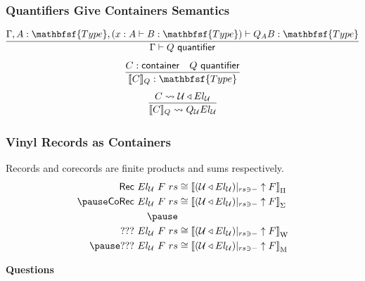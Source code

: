 \documentclass[tikz, 12pt]{beamer}
\def\Type{\mathbfsf{Type}}
\begin{document}
\begin{frame}
  \frametitle{Quantifiers Give Containers Semantics}
  \[
    \infer{\Gamma\vdash Q\ \mathsf{quantifier}}{
      \Gamma,A:\Type, (x:A\vdash B:\Type) \vdash Q_AB:\Type
    }
  \]\pause
  \[
    \infer{\llbracket C\rrbracket_Q : \Type}{
      C : \container &
      Q\ \mathsf{quantifier}
    }
  \]\pause
  \[
    \infer{
      \llbracket C\rrbracket_Q \leadsto Q_\mathcal{U} El_\mathcal{U}
    }{
      C \leadsto \mkcon{\mathcal{U}}{El_\mathcal{U}}
    }
  \]
\end{frame}

\begin{frame}
  \frametitle{Vinyl Records as Containers}\pause
  Records and corecords are finite products and sums respectively.\pause
  \[
    \begin{aligned}
      \mathsf{Rec}\ El_\mathcal{U}\ F\ rs
        &\cong \left\llbracket (\mkcon{\mathcal{U}}{El_\mathcal{U}})|_{rs\ni-}\uparrow F \right\rrbracket_\Pi\\ \pause
      \mathsf{CoRec}\ El_\mathcal{U}\ F\ rs
        &\cong \left\llbracket (\mkcon{\mathcal{U}}{El_\mathcal{U}})|_{rs\ni-}\uparrow F \right\rrbracket_\Sigma\\ \pause
      \\
      ???\ El_\mathcal{U}\ F\ rs
        &\cong \left\llbracket (\mkcon{\mathcal{U}}{El_\mathcal{U}})|_{rs\ni-}\uparrow F \right\rrbracket_\mathrm{W}\\ \pause
      ???\ El_\mathcal{U}\ F\ rs
        &\cong \left\llbracket (\mkcon{\mathcal{U}}{El_\mathcal{U}})|_{rs\ni-}\uparrow F \right\rrbracket_\mathrm{M}
    \end{aligned}
  \]
\end{frame}

\begin{frame}
  \centerline{\textbf{Questions}}
\end{frame}
\end{document}

